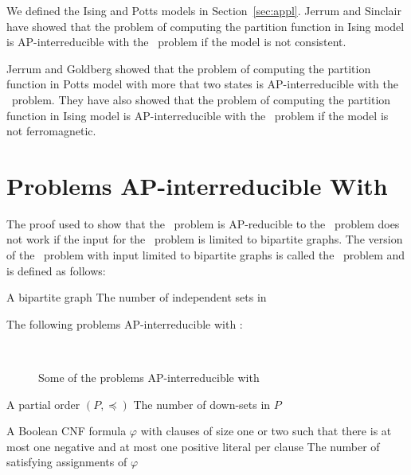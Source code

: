 We defined the Ising and Potts models in Section~\ref{sec:appl}\@.
Jerrum and Sinclair \cite{Jer93} have showed that the problem of computing
the partition function in Ising model is AP-interreducible with the \csat\ problem
if the model is not consistent.

Jerrum and Goldberg \cite{Goldberg2007} showed that the problem of computing 
the partition function in Potts model with more that two states is
AP-interreducible with the \csat\ problem. They have also showed that the problem of computing
the partition function in Ising model is AP-interreducible with the \csat\ problem
if the model is not ferromagnetic.

\section{Problems AP-interreducible With \cbis} \label{sec:bis}
The proof used to show that the \csat\ problem is AP-reducible to the \cis\ problem does
not work if the input for the \cis\ problem is limited to bipartite graphs.
The version of the \cis\ problem with input limited to bipartite graphs is called
the \cbis\ problem and is defined as follows:

\pnndef%
{A bipartite graph \mG}
{The number of independent sets in \mG}

The following problems AP-interreducible with \cbis:

\begin{figure}[h]
\centering
{}\hfill 
\subfigure[\ensuremath{P_4}]{\label{fig:p4}}\hfill
{}\\
{}\hfill
\subfigure[\ensuremath{P^*_k}]{\label{fig:psk}}
\caption{Some of the problems AP-interreducible with \cbis}
\label{fig:bisred}
\end{figure} 

\pdef{\cds}
{A partial order \((P,\preceq)\)}
{The number of down-sets in \(P\)}

{A Boolean CNF formula \(\varphi\) with clauses of size one or two such that
there is at most one negative and at most one positive literal per clause}
{The number of satisfying assignments of \(\varphi\)}

